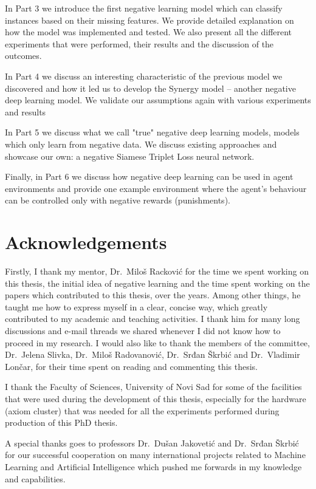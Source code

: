 \documentclass[b5paper]{book}
\begin{document}
In Part 3 we introduce the first negative learning model which can classify instances based on their missing features. We provide detailed explanation on how the model was implemented and tested. We also present all the different experiments that were performed, their results and the discussion of the outcomes.

In Part 4 we discuss an interesting characteristic of the previous model we discovered and how it led us to develop the Synergy model -- another negative deep learning model. We validate our assumptions again with various experiments and results

In Part 5 we discuss what we call "true" negative deep learning models, models which only learn from negative data. We discuss existing approaches and showcase our own: a negative Siamese Triplet Loss neural network.

Finally, in Part 6 we discuss how negative deep learning can be used in agent environments and provide one example environment where the agent's behaviour can be controlled only with negative rewards (punishments).

\section*{Acknowledgements}

Firstly, I thank my mentor, Dr.~Miloš Racković for the time we spent working on this thesis, the initial idea of negative learning and the time spent working on the papers which contributed to this thesis, over the years. Among other things, he taught me how to express myself in a clear, concise way, which greatly contributed to my academic and teaching activities. I thank him for many long discussions and e-mail threads we shared whenever I did not know how to proceed in my research. I would also like to thank the members of the committee, Dr.~Jelena Slivka, Dr.~Miloš Radovanović, Dr.~Srđan Škrbić and Dr.~Vladimir Lončar, for their time spent on reading and commenting this thesis.

I thank the Faculty of Sciences, University of Novi Sad for some of
the facilities that were used during the development of this thesis, especially for the hardware (axiom cluster) that was needed for all the experiments performed during production of this PhD thesis.

A special thanks goes to professors Dr.~Dušan Jakovetić and Dr.~Srđan Škrbić for our successful cooperation on many international projects related to Machine Learning and Artificial Intelligence which pushed me forwards in my knowledge and capabilities.
\end{document}
